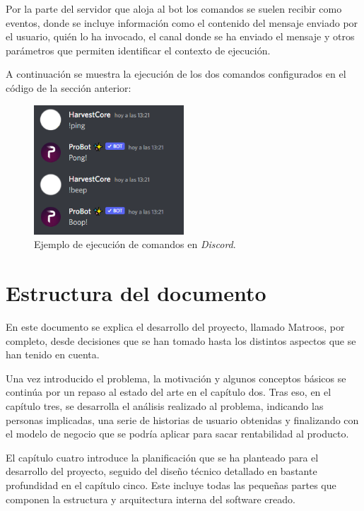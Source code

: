 Por la parte del servidor que aloja al bot los comandos se suelen recibir como eventos, donde se incluye información como el contenido del mensaje enviado por el usuario, quién lo ha invocado, el canal donde se ha enviado el mensaje y otros parámetros que permiten identificar el contexto de ejecución.

A continuación se muestra la ejecución de los dos comandos configurados en el código de la sección anterior:

\begin{figure}[H]
	\centering
	\includegraphics[width=0.5\textwidth]{img/commands.png}
	\caption{Ejemplo de ejecución de comandos en \textit{Discord}.}
\end{figure}



\section{Estructura del documento}

En este documento se explica el desarrollo del proyecto, llamado Matroos, por completo, desde decisiones que se han tomado hasta los distintos aspectos que se han tenido en cuenta.

Una vez introducido el problema, la motivación y algunos conceptos básicos se continúa por un repaso al estado del arte en el capítulo dos. Tras eso, en el capítulo tres, se desarrolla el análisis realizado al problema, indicando las personas implicadas, una serie de historias de usuario obtenidas y finalizando con el modelo de negocio que se podría aplicar para sacar rentabilidad al producto.

El capítulo cuatro introduce la planificación que se ha planteado para el desarrollo del proyecto, seguido del diseño técnico detallado en bastante profundidad en el capítulo cinco. Este incluye todas las pequeñas partes que componen la estructura y arquitectura interna del software creado.

